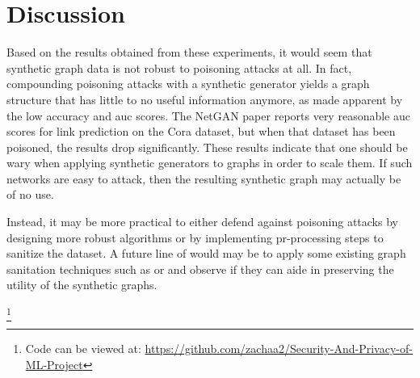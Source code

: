\documentclass{article}
\begin{document}
\section{Discussion}
\label{Discussion}

Based on the results obtained from these experiments, it would seem that synthetic graph data is not robust to poisoning attacks at all. In fact, compounding poisoning attacks with a synthetic generator yields a graph structure that has little to no useful information anymore, as made apparent by the low accuracy and auc scores. The NetGAN paper \cite{bojchevski2018netgan} reports very reasonable auc scores for link prediction on the Cora dataset, but when that dataset has been poisoned, the results drop significantly. These results indicate that one should be wary when applying synthetic generators to graphs in order to scale them. If such networks are easy to attack, then the resulting synthetic graph may actually be of no use. 

Instead, it may be more practical to either defend against poisoning attacks by designing more robust algorithms or by implementing pr-processing steps to sanitize the dataset. A future line of would may be to apply some existing graph sanitation techniques such as \cite{zhu2023focusedcleaner} or \cite{xu2021graphSanitation} and observe if they can aide in preserving the utility of the synthetic graphs. 

\footnote{Code can be viewed at: \url{https://github.com/zachaa2/Security-And-Privacy-of-ML-Project}}

\nocite{*}


\end{document}
